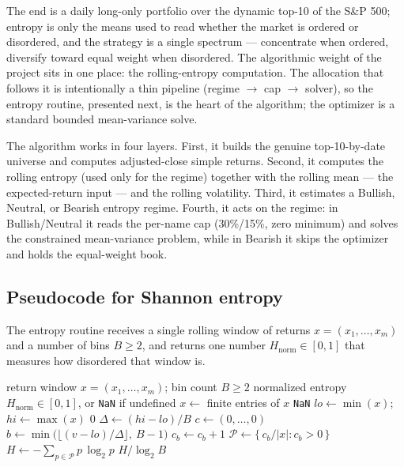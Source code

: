\documentclass[a4paper,12pt]{article}
\begin{document}
The end is a daily long-only portfolio over the dynamic top-10 of the S\&P 500; entropy is only the means used to read whether the market is ordered or disordered, and the strategy is a single spectrum --- concentrate when ordered, diversify toward equal weight when disordered. The algorithmic weight of the project sits in one place: the rolling-entropy computation. The allocation that follows it is intentionally a thin pipeline (regime $\to$ cap $\to$ solver), so the entropy routine, presented next, is the heart of the algorithm; the optimizer is a standard bounded mean-variance solve.

The algorithm works in four layers. First, it builds the genuine top-10-by-date universe and computes adjusted-close simple returns. Second, it computes the rolling entropy (used only for the regime) together with the rolling mean --- the expected-return input --- and the rolling volatility. Third, it estimates a Bullish, Neutral, or Bearish entropy regime. Fourth, it acts on the regime: in Bullish/Neutral it reads the per-name cap (30\%/15\%, zero minimum) and solves the constrained mean-variance problem, while in Bearish it skips the optimizer and holds the equal-weight book.

\subsection{Pseudocode for Shannon entropy}

The entropy routine receives a single rolling window of returns $x=(x_1,\ldots,x_m)$ and a number of bins $B\ge 2$, and returns one number $H_{\mathrm{norm}}\in[0,1]$ that measures how disordered that window is.

\begin{algorithm}[H]
\caption{\textsc{ShannonEntropy}: normalized entropy of one rolling return window}
\begin{algorithmic}[1]
\Require return window $x=(x_1,\ldots,x_m)$; bin count $B\ge 2$
\Ensure normalized entropy $H_{\mathrm{norm}}\in[0,1]$, or \texttt{NaN} if undefined
\State $x \gets$ finite entries of $x$ 
 \Return \texttt{NaN} 
\EndIf
\State $\mathit{lo}\gets\min(x)$;\quad $\mathit{hi}\gets\max(x)$ 
 \Return $0$ 
\EndIf
\State $\Delta \gets (\mathit{hi}-\mathit{lo})/B$ 
\State $c \gets (0,\ldots,0)$ 
 
    \State $b \gets \min\!\big(\lfloor (v-\mathit{lo})/\Delta\rfloor,\ B-1\big)$ 
    \State $c_b \gets c_b + 1$
\EndFor
\State $\mathcal{P}\gets\{\,c_b/|x| : c_b>0\,\}$ 
\State $H \gets -\sum_{p\in\mathcal{P}} p\,\log_2 p$
\State \Return $H/\log_2 B$ 
\end{algorithmic}
\end{algorithm}
\end{document}
